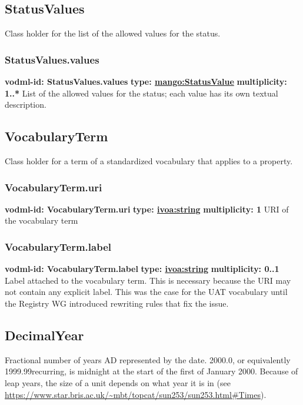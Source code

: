   \subsection{StatusValues}
  \label{sect:StatusValues}
    Class holder for the list of the allowed values for the status.

    \subsubsection{StatusValues.values}
      \textbf{vodml-id: StatusValues.values} \newline
      \textbf{type: \hyperref[sect:StatusValue]{mango:StatusValue}} \newline
      \textbf{multiplicity: 1..*} \newline
      List of the allowed values for the status; each value has its own textual description.

  \subsection{VocabularyTerm}
  \label{sect:VocabularyTerm}
    Class holder for a term of a standardized vocabulary that applies to a property.

    \subsubsection{VocabularyTerm.uri}
      \textbf{vodml-id: VocabularyTerm.uri} \newline
      \textbf{type: \hyperref[sect:ivoa]{ivoa:string}} \newline
      \textbf{multiplicity: 1} \newline
      URI of the vocabulary term

    \subsubsection{VocabularyTerm.label}
      \textbf{vodml-id: VocabularyTerm.label} \newline
      \textbf{type: \hyperref[sect:ivoa]{ivoa:string}} \newline
      \textbf{multiplicity: 0..1} \newline
      Label attached to the vocabulary term. This is necessary because the URI may not contain any explicit label. This was the case for the UAT vocabulary until the Registry WG introduced rewriting rules that fix the issue.

  \subsection{DecimalYear}
  \label{sect:DecimalYear}
  Fractional number of years AD represented by the date. 2000.0, or equivalently 1999.99recurring, is midnight at the start of the first of January 2000. Because of leap years, the size of a unit depends on what year it is in (see \url{https://www.star.bris.ac.uk/~mbt/topcat/sun253/sun253.html#Times}).

